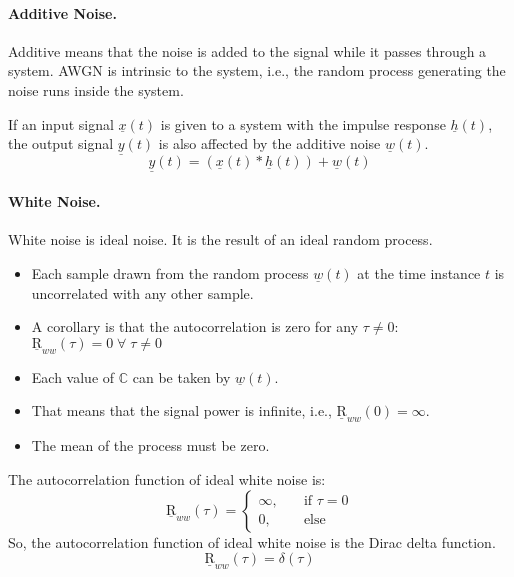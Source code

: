 \begin{refsection}
\paragraph{Additive Noise.}

 Additive means that the noise is added to the signal while it passes through a system. \ac{AWGN} is intrinsic to the system, i.e., the random process generating the noise runs inside the system.

If an input signal $\underline{x}(t)$ is given to a system with the impulse response $\underline{h}(t)$, the output signal $\underline{y}(t)$ is also affected by the additive noise $\underline{w}(t)$.
\begin{equation}
	\underline{y}(t) = \left(\underline{x}(t) * \underline{h}(t)\right) + \underline{w}(t)
\end{equation}%

\paragraph{White Noise.}

 White noise is ideal noise. It is the result of an ideal random process.
\begin{itemize}
	\item Each sample drawn from the random process $\underline{w}(t)$ at the time instance $t$ is uncorrelated with any other sample.
	\item A corollary is that the autocorrelation is zero for any $\tau \neq 0$: $\underline{\mathrm{R}}_{ww}(\tau) = 0 \; \forall\; \tau \neq 0$
	\item Each value of $\mathbb{C}$ can be taken by $\underline{w}(t)$.
	\item That means that the signal power is infinite, i.e., $\underline{\mathrm{R}}_{ww}(0) = \infty$.
	\item The mean of the process must be zero.
\end{itemize}

The autocorrelation function of ideal white noise is:
\begin{equation}
	\underline{\mathrm{R}}_{ww}(\tau) = \begin{cases}
		\infty, & \quad \text{if } \tau = 0 \\
		0, & \quad \text{else}
	\end{cases}
\end{equation}
So, the autocorrelation function of ideal white noise is the Dirac delta function.
\begin{equation}
	\underline{\mathrm{R}}_{ww}(\tau) = \delta(\tau)
\end{equation}


\end{refsection}
